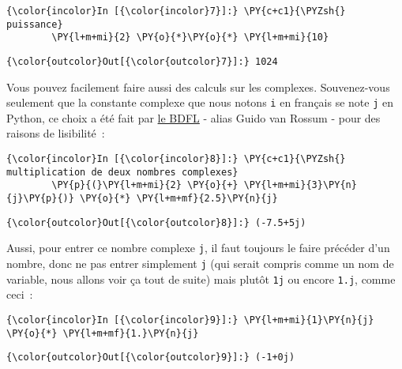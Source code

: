     \begin{Verbatim}[commandchars=\\\{\}]
{\color{incolor}In [{\color{incolor}7}]:} \PY{c+c1}{\PYZsh{} puissance}
        \PY{l+m+mi}{2} \PY{o}{*}\PY{o}{*} \PY{l+m+mi}{10}
\end{Verbatim}


\begin{Verbatim}[commandchars=\\\{\}]
{\color{outcolor}Out[{\color{outcolor}7}]:} 1024
\end{Verbatim}
            
    Vous pouvez facilement faire aussi des calculs sur les complexes.
Souvenez-vous seulement que la constante complexe que nous notons
\texttt{i} en français se note \texttt{j} en Python, ce choix a été fait
par \href{https://fr.wikipedia.org/wiki/Benevolent_Dictator_for_Life}{le
BDFL} - alias Guido van Rossum - pour des raisons de lisibilité~:

    \begin{Verbatim}[commandchars=\\\{\}]
{\color{incolor}In [{\color{incolor}8}]:} \PY{c+c1}{\PYZsh{} multiplication de deux nombres complexes}
        \PY{p}{(}\PY{l+m+mi}{2} \PY{o}{+} \PY{l+m+mi}{3}\PY{n}{j}\PY{p}{)} \PY{o}{*} \PY{l+m+mf}{2.5}\PY{n}{j}
\end{Verbatim}


\begin{Verbatim}[commandchars=\\\{\}]
{\color{outcolor}Out[{\color{outcolor}8}]:} (-7.5+5j)
\end{Verbatim}
            
    Aussi, pour entrer ce nombre complexe \texttt{j}, il faut toujours le
faire précéder d'un nombre, donc ne pas entrer simplement \texttt{j}
(qui serait compris comme un nom de variable, nous allons voir ça tout
de suite) mais plutôt \texttt{1j} ou encore \texttt{1.j}, comme ceci~:

    \begin{Verbatim}[commandchars=\\\{\}]
{\color{incolor}In [{\color{incolor}9}]:} \PY{l+m+mi}{1}\PY{n}{j} \PY{o}{*} \PY{l+m+mf}{1.}\PY{n}{j}
\end{Verbatim}


\begin{Verbatim}[commandchars=\\\{\}]
{\color{outcolor}Out[{\color{outcolor}9}]:} (-1+0j)
\end{Verbatim}
            
